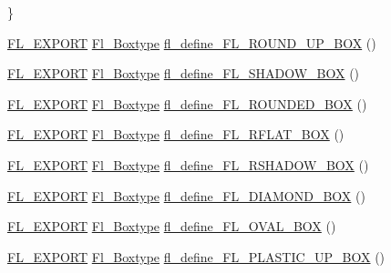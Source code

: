 \begin{DoxyCompactItemize}
 \}
\item 
\hyperlink{_fl___export_8_h_aa9ba29a18aee9d738370a06eeb4470fc}{F\+L\+\_\+\+E\+X\+P\+O\+RT} \hyperlink{_enumerations_8_h_ae48bf9070f8541de17829f54ccacc6bc}{Fl\+\_\+\+Boxtype} \hyperlink{_enumerations_8_h_a10a70f87f0e34937ae479b07fa9cfbf0}{fl\+\_\+define\+\_\+\+F\+L\+\_\+\+R\+O\+U\+N\+D\+\_\+\+U\+P\+\_\+\+B\+OX} ()
\item 
\hyperlink{_fl___export_8_h_aa9ba29a18aee9d738370a06eeb4470fc}{F\+L\+\_\+\+E\+X\+P\+O\+RT} \hyperlink{_enumerations_8_h_ae48bf9070f8541de17829f54ccacc6bc}{Fl\+\_\+\+Boxtype} \hyperlink{_enumerations_8_h_a4bb54e3e06e377e803dc913d4d61630a}{fl\+\_\+define\+\_\+\+F\+L\+\_\+\+S\+H\+A\+D\+O\+W\+\_\+\+B\+OX} ()
\item 
\hyperlink{_fl___export_8_h_aa9ba29a18aee9d738370a06eeb4470fc}{F\+L\+\_\+\+E\+X\+P\+O\+RT} \hyperlink{_enumerations_8_h_ae48bf9070f8541de17829f54ccacc6bc}{Fl\+\_\+\+Boxtype} \hyperlink{_enumerations_8_h_a5830cccb7640d9fb61c1067200b4b9d2}{fl\+\_\+define\+\_\+\+F\+L\+\_\+\+R\+O\+U\+N\+D\+E\+D\+\_\+\+B\+OX} ()
\item 
\hyperlink{_fl___export_8_h_aa9ba29a18aee9d738370a06eeb4470fc}{F\+L\+\_\+\+E\+X\+P\+O\+RT} \hyperlink{_enumerations_8_h_ae48bf9070f8541de17829f54ccacc6bc}{Fl\+\_\+\+Boxtype} \hyperlink{_enumerations_8_h_a6f64fe52f3ed86bde407c67a61f5a2a4}{fl\+\_\+define\+\_\+\+F\+L\+\_\+\+R\+F\+L\+A\+T\+\_\+\+B\+OX} ()
\item 
\hyperlink{_fl___export_8_h_aa9ba29a18aee9d738370a06eeb4470fc}{F\+L\+\_\+\+E\+X\+P\+O\+RT} \hyperlink{_enumerations_8_h_ae48bf9070f8541de17829f54ccacc6bc}{Fl\+\_\+\+Boxtype} \hyperlink{_enumerations_8_h_a7c68477f8da9f5fc9af0b1d0e20d79a3}{fl\+\_\+define\+\_\+\+F\+L\+\_\+\+R\+S\+H\+A\+D\+O\+W\+\_\+\+B\+OX} ()
\item 
\hyperlink{_fl___export_8_h_aa9ba29a18aee9d738370a06eeb4470fc}{F\+L\+\_\+\+E\+X\+P\+O\+RT} \hyperlink{_enumerations_8_h_ae48bf9070f8541de17829f54ccacc6bc}{Fl\+\_\+\+Boxtype} \hyperlink{_enumerations_8_h_a137c1cb224a3e3aecb91608a1567e915}{fl\+\_\+define\+\_\+\+F\+L\+\_\+\+D\+I\+A\+M\+O\+N\+D\+\_\+\+B\+OX} ()
\item 
\hyperlink{_fl___export_8_h_aa9ba29a18aee9d738370a06eeb4470fc}{F\+L\+\_\+\+E\+X\+P\+O\+RT} \hyperlink{_enumerations_8_h_ae48bf9070f8541de17829f54ccacc6bc}{Fl\+\_\+\+Boxtype} \hyperlink{_enumerations_8_h_a36d20b2fd40d9665512ee16fe89670db}{fl\+\_\+define\+\_\+\+F\+L\+\_\+\+O\+V\+A\+L\+\_\+\+B\+OX} ()
\item 
\hyperlink{_fl___export_8_h_aa9ba29a18aee9d738370a06eeb4470fc}{F\+L\+\_\+\+E\+X\+P\+O\+RT} \hyperlink{_enumerations_8_h_ae48bf9070f8541de17829f54ccacc6bc}{Fl\+\_\+\+Boxtype} \hyperlink{_enumerations_8_h_a5789d998f2b5e51e11e386fcbbe7bbb2}{fl\+\_\+define\+\_\+\+F\+L\+\_\+\+P\+L\+A\+S\+T\+I\+C\+\_\+\+U\+P\+\_\+\+B\+OX} ()

\end{DoxyCompactItemize}
